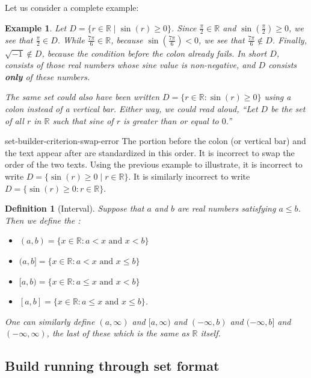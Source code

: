 \documentclass{book}
\newcounter{ekcounter}%
\theoremstyle{ekimcustom}
\newtheorem{example}[ekcounter]{Example}
\newtheorem{definition}[ekcounter]{Definition}
\newcommand\defn[1]{{\color{blue}{\bf #1}}}
\begin{document}
Let us consider a complete example:
\begin{example}
Let $D = \{r \in \mathbb{R} \mid \sin(r) \geq 0\}$. Since $\frac\pi2 \in \mathbb{R}$ and $\sin(\frac\pi2) \geq 0$, we see that $\frac\pi2 \in D$. While $\frac{7\pi}{6} \in \mathbb{R}$, because $\sin(\frac{7\pi}{6}) < 0$, we see that $\frac{7\pi}{6} \not\in D$. Finally, $\sqrt{-1} \not\in D$, because the condition before the colon already fails. In short $D$, consists of those real numbers whose sine value is non-negative, and $D$ consists {\bf only} of these numbers.

The same set could also have been written $D = \{r \in \mathbb{R} : \sin(r) \geq 0\}$ using a colon instead of a vertical bar. Either way, we could read aloud, ``Let $D$ be the set of all $r$ in $\mathbb{R}$ such that sine of $r$ is greater than or equal to $0$.''
\end{example}
  
\begin{bwarning}{}{set-builder-criterion-swap-error}
The portion before the colon (or vertical bar) and the text appear after are standardized in this order. It is incorrect to swap the order of the two texts.
\vskip6pt
Using the previous example to illustrate, it is incorrect to write $D = \{ \sin(r) \geq 0 \mid r \in \mathbb{R}\}$. It is similarly incorrect to write $D = \{ \sin(r) \geq 0 : r \in \mathbb{R}\}$.
\end{bwarning}

\begin{definition}[Interval]\label{definition:interval}
Suppose that $a$ and $b$ are real numbers satisfying $a \leq b$. Then we define the \defn{intervals}:
\begin{itemize}
\item $(a,b) = \{x \in \mathbb{R} : a < x \text{ and } x < b\}$
\item $(a,b] = \{x \in \mathbb{R} : a < x \text{ and } x \leq b\}$
\item $[a,b) = \{x \in \mathbb{R} : a \leq x \text{ and } x < b\}$
\item $[a,b] = \{x \in \mathbb{R} : a \leq x \text{ and } x \leq b\}$.
\end{itemize}
One can similarly define $(a,\infty)$ and $[a,\infty)$ and $(-\infty,b)$ and $(-\infty,b]$ and $(-\infty,\infty)$, the last of these which is the same as $\mathbb{R}$ itself.
\end{definition}

\subsection{Build running through set format}\label{section:build-running}
\end{document}
